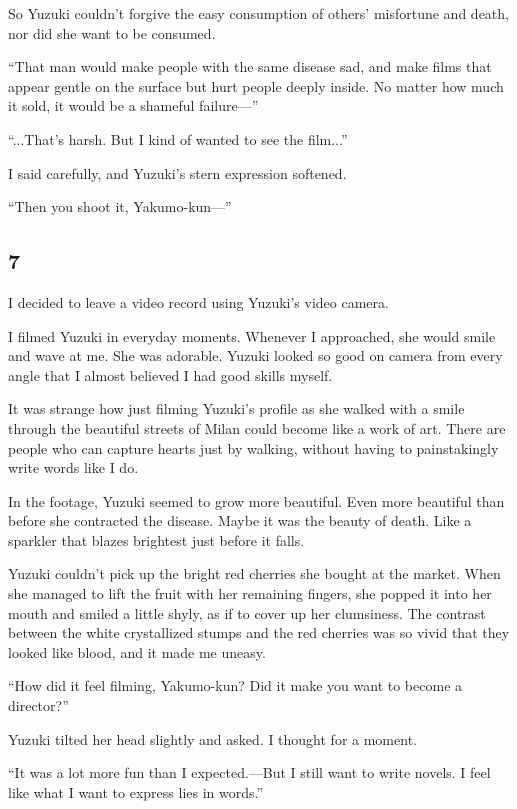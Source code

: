 \documentclass[
    a4paper,
    12pt,
    twoside,
    openany,
    UTF8,
    fontset=windows
]{ctexbook}
\begin{document}
So Yuzuki couldn't forgive the easy consumption of others' misfortune and death, nor did she want to be consumed.

``That man would make people with the same disease sad, and make films that appear gentle on the surface but hurt people deeply inside. No matter how much it sold, it would be a shameful failure---''

``...That's harsh. But I kind of wanted to see the film...''

I said carefully, and Yuzuki's stern expression softened.

``Then you shoot it, Yakumo-kun---''


\subsection*{7}

I decided to leave a video record using Yuzuki's video camera.

I filmed Yuzuki in everyday moments. Whenever I approached, she would smile and wave at me. She was adorable. Yuzuki looked so good on camera from every angle that I almost believed I had good skills myself.

It was strange how just filming Yuzuki's profile as she walked with a smile through the beautiful streets of Milan could become like a work of art. There are people who can capture hearts just by walking, without having to painstakingly write words like I do.

In the footage, Yuzuki seemed to grow more beautiful. Even more beautiful than before she contracted the disease. Maybe it was the beauty of death. Like a sparkler that blazes brightest just before it falls.

Yuzuki couldn't pick up the bright red cherries she bought at the market. When she managed to lift the fruit with her remaining fingers, she popped it into her mouth and smiled a little shyly, as if to cover up her clumsiness. The contrast between the white crystallized stumps and the red cherries was so vivid that they looked like blood, and it made me uneasy.

``How did it feel filming, Yakumo-kun? Did it make you want to become a director?''

Yuzuki tilted her head slightly and asked. I thought for a moment.

``It was a lot more fun than I expected.---But I still want to write novels. I feel like what I want to express lies in words.''
\end{document}
